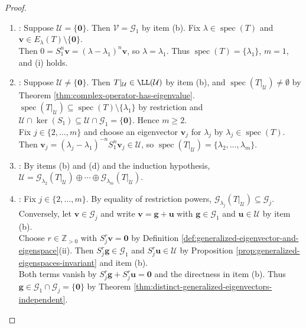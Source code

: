 \begin{theorem}
\begin{proof}
\begin{enumerate}[label=(\roman*)]
\begin{enumerate}[label=(\alph*)]
Since $\lambda_1$ is an eigenvalue, $\mathcal{G}_1\neq\{\mathbf{0}\}$ by Definition \ref{def:generalized-eigenvector-and-eigenspace}(i); hence $\dim(\mathcal{U})<n$ by Theorem \ref{thm:direct-sum-iff-dimensions-add}(i).
\item {}: Suppose $\mathcal{U}=\{\mathbf{0}\}$. Then $\mathcal{V}=\mathcal{G}_1$ by item (b). Fix $\lambda\in\operatorname{spec}(T)$ and $\mathbf{v}\in E_{\lambda}(T)\setminus\{\mathbf{0}\}$.\\
Then $0=S_1^n\mathbf{v}=(\lambda-\lambda_1)^n\mathbf{v}$, so $\lambda=\lambda_1$. Thus $\operatorname{spec}(T)=\{\lambda_1\}$, $m=1$, and (i) holds.
\item {}: Suppose $\mathcal{U}\neq\{\mathbf{0}\}$. Then $T|_{\mathcal{U}}\in\LL(\mathcal{U})$ by item (b), and $\operatorname{spec}(T|_{\mathcal{U}})\neq\emptyset$ by Theorem \ref{thm:complex-operator-has-eigenvalue}.\\
$\operatorname{spec}(T|_{\mathcal{U}})\subseteq\operatorname{spec}(T)\setminus\{\lambda_1\}$ by restriction and $\mathcal{U}\cap\ker(S_1)\subseteq\mathcal{U}\cap\mathcal{G}_1=\{\mathbf{0}\}$. Hence $m\geq2$.\\
Fix $j\in\{2,\ldots,m\}$ and choose an eigenvector $\mathbf{v}_j$ for $\lambda_j$ by $\lambda_j\in\operatorname{spec}(T)$.\\
Then $\mathbf{v}_j=(\lambda_j-\lambda_1)^{-n}S_1^n\mathbf{v}_j\in\mathcal{U}$, so $\operatorname{spec}(T|_{\mathcal{U}})=\{\lambda_2,\ldots,\lambda_m\}$.
\item {}: By items (b) and (d) and the induction hypothesis, $\mathcal{U}=\mathcal{G}_{\lambda_2}(T|_{\mathcal{U}})\oplus\cdots\oplus\mathcal{G}_{\lambda_m}(T|_{\mathcal{U}})$.
\item {}: Fix $j\in\{2,\ldots,m\}$. By equality of restriction powers, $\mathcal{G}_{\lambda_j}(T|_{\mathcal{U}})\subseteq\mathcal{G}_j$.\\
Conversely, let $\mathbf{v}\in\mathcal{G}_j$ and write $\mathbf{v}=\mathbf{g}+\mathbf{u}$ with $\mathbf{g}\in\mathcal{G}_1$ and $\mathbf{u}\in\mathcal{U}$ by item (b).\\
Choose $r\in\mathbb{Z}_{>0}$ with $S_j^r\mathbf{v}=\mathbf{0}$ by Definition \ref{def:generalized-eigenvector-and-eigenspace}(ii). Then $S_j^r\mathbf{g}\in\mathcal{G}_1$ and $S_j^r\mathbf{u}\in\mathcal{U}$ by Proposition \ref{prop:generalized-eigenspaces-invariant} and item (b).\\
Both terms vanish by $S_j^r\mathbf{g}+S_j^r\mathbf{u}=\mathbf{0}$ and the directness in item (b). Thus $\mathbf{g}\in\mathcal{G}_1\cap\mathcal{G}_j=\{\mathbf{0}\}$ by Theorem \ref{thm:distinct-generalized-eigenvectors-independent}.\\

\end{enumerate}
\end{enumerate}
\end{proof}
\end{theorem}
